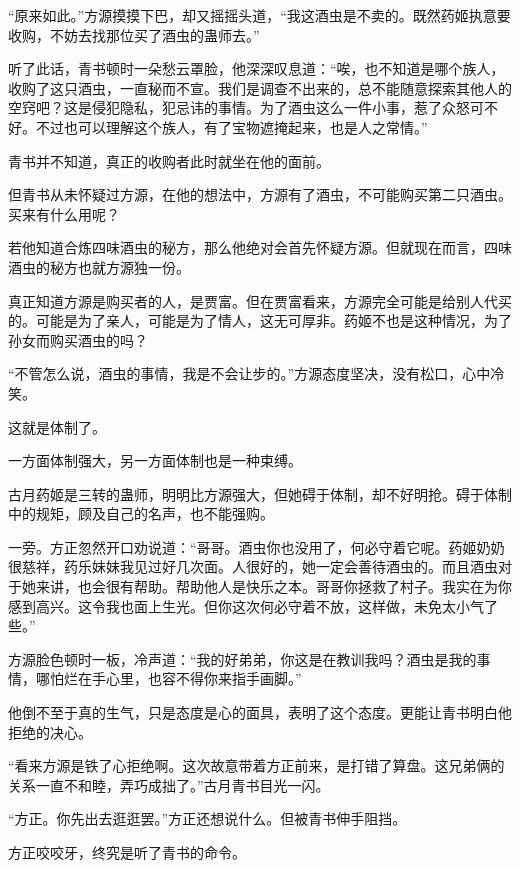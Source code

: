 
\begin{this_body}

“原来如此。”方源摸摸下巴，却又摇摇头道，“我这酒虫是不卖的。既然药姬执意要收购，不妨去找那位买了酒虫的蛊师去。”

听了此话，青书顿时一朵愁云罩脸，他深深叹息道：“唉，也不知道是哪个族人，收购了这只酒虫，一直秘而不宣。我们是调查不出来的，总不能随意探索其他人的空窍吧？这是侵犯隐私，犯忌讳的事情。为了酒虫这么一件小事，惹了众怒可不好。不过也可以理解这个族人，有了宝物遮掩起来，也是人之常情。”

青书并不知道，真正的收购者此时就坐在他的面前。

但青书从未怀疑过方源，在他的想法中，方源有了酒虫，不可能购买第二只酒虫。买来有什么用呢？

若他知道合炼四味酒虫的秘方，那么他绝对会首先怀疑方源。但就现在而言，四味酒虫的秘方也就方源独一份。

真正知道方源是购买者的人，是贾富。但在贾富看来，方源完全可能是给别人代买的。可能是为了亲人，可能是为了情人，这无可厚非。药姬不也是这种情况，为了孙女而购买酒虫的吗？

“不管怎么说，酒虫的事情，我是不会让步的。”方源态度坚决，没有松口，心中冷笑。

这就是体制了。

一方面体制强大，另一方面体制也是一种束缚。

古月药姬是三转的蛊师，明明比方源强大，但她碍于体制，却不好明抢。碍于体制中的规矩，顾及自己的名声，也不能强购。

一旁。方正忽然开口劝说道：“哥哥。酒虫你也没用了，何必守着它呢。药姬奶奶很慈祥，药乐妹妹我见过好几次面。人很好的，她一定会善待酒虫的。而且酒虫对于她来讲，也会很有帮助。帮助他人是快乐之本。哥哥你拯救了村子。我实在为你感到高兴。这令我也面上生光。但你这次何必守着不放，这样做，未免太小气了些。”

方源脸色顿时一板，冷声道：“我的好弟弟，你这是在教训我吗？酒虫是我的事情，哪怕烂在手心里，也容不得你来指手画脚。”

他倒不至于真的生气，只是态度是心的面具，表明了这个态度。更能让青书明白他拒绝的决心。

“看来方源是铁了心拒绝啊。这次故意带着方正前来，是打错了算盘。这兄弟俩的关系一直不和睦，弄巧成拙了。”古月青书目光一闪。

“方正。你先出去逛逛罢。”方正还想说什么。但被青书伸手阻挡。

方正咬咬牙，终究是听了青书的命令。


\end{this_body}
